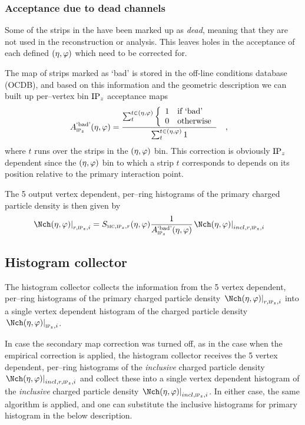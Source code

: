 \documentclass[compat,11pt]{alicenote}
\DeclareRobustCommand{\AlwaysText}[1]{\ifmmode\relax\text{#1}\else #1\fi}
\newcommand*\OCDB{\AlwaysText{OCDB}}
\newcommand*{\etaphi}{\ensuremath(\eta,\varphi)}
\newcommand*\SecMap{\ensuremath S_{\subMC,\subIPz,r}\etaphi}
\newcommand{\dndetadphi}[1][]{{\ensuremath%
    \ifx|#1|\else\left.\fi%
      \Nch\etaphi%
      \ifx|#1|\else\right|_{#1}\fi}}
\newcommand{\DeadCh}{\ensuremath A^{\text{`bad'}}_{\subIPz}\etaphi}
\begin{document}
\subsubsection{Acceptance due to dead channels}

Some of the strips in the \FMD{} have been marked up as \emph{dead},
meaning that they are not used in the reconstruction or analysis.
This leaves holes in the acceptance of each defined $\etaphi$ which
need to be corrected for.

The map of strips marked as `bad' is stored in the off-line conditions
database (\OCDB{}), and based on this information and the geometric
description we can built up per--vertex bin $\IPz$ acceptance maps
\begin{align}
  \label{eq:dead_channels} 
  \DeadCh{} &= 
  \frac{\sum_t^{t\in\etaphi}\left\{\begin{array}{cl}
        1 & \text{if `bad'}\\
        0 & \text{otherwise}
      \end{array}\right.}{\sum_t^{t\in\etaphi} 1}\quad,
\end{align}
where $t$ runs over the strips in the $\etaphi$ bin.  This correction
is obviously $\IPz$ dependent since the $\etaphi$ bin to which a strip $t$
corresponds to depends on its position relative to the primary
interaction point. 

The 5 output vertex dependent, per--ring histograms of the primary
charged particle density is then given by
\begin{align}
  \dndetadphi[r,\subIPz,i] &=
  \SecMap{} \frac{1}{\DeadCh{}}\dndetadphi[incl,r,\subIPz,i]
\end{align}

\subsection{Histogram collector}
\label{sec:sub:hist_collector}

The histogram collector collects the information from the 5 vertex
dependent, per--ring histograms of the primary charged particle
density $\dndetadphi[r,\subIPz,i]$ into a single vertex dependent
histogram of the charged particle density $\dndetadphi[\subIPz,i]$.

In case the secondary map correction was turned off, as in the case
when the empirical correction is applied, the histogram collector
receives the 5 vertex dependent, per--ring histograms of the
\emph{inclusive} charged particle density
$\dndetadphi[incl,r,\subIPz,i]$ and collect these into a single vertex
dependent histogram of the \emph{inclusive} charged particle density
$\dndetadphi[incl,\subIPz,i]$.  In either case, the same algorithm is
applied, and one can substitute the inclusive histograms for primary
histogram in the below description. 
\end{document}
